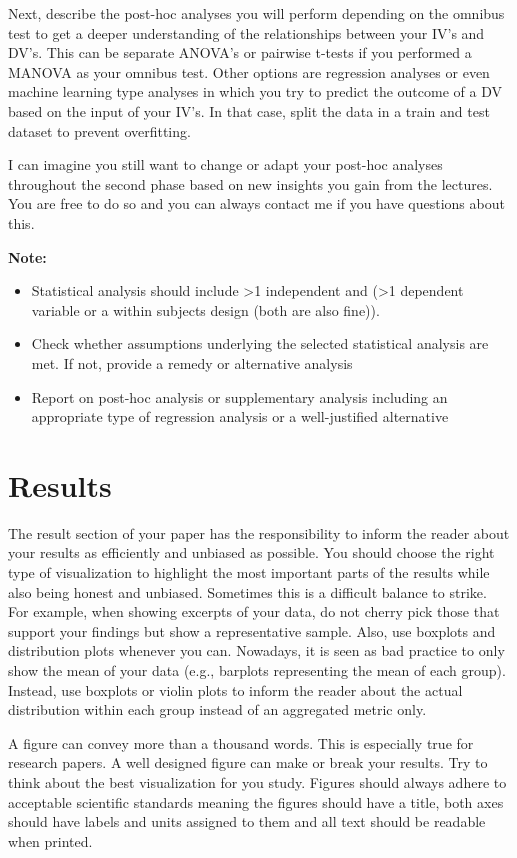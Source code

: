 \documentclass[10pt,a4paper]{article}
\begin{document}
Next, describe the post-hoc analyses you will perform depending on the omnibus test to get a deeper understanding of the relationships between your IV's and DV's. This can be separate ANOVA's or pairwise t-tests if you performed a MANOVA as your omnibus test. Other options are regression analyses or even machine learning type analyses in which you try to predict the outcome of a DV based on the input of your IV's. In that case, split the data in a train and test dataset to prevent overfitting. 

I can imagine you still want to change or adapt your post-hoc analyses throughout the second phase based on new insights you gain from the lectures. You are free to do so and you can always contact me if you have questions about this.

\textbf{Note:}
\begin{itemize}
    \item Statistical analysis should include >1 independent and (>1 dependent variable or a within subjects design (both are also fine)). 
    \item Check whether assumptions underlying the selected statistical analysis are met. If not, provide a remedy or alternative analysis
    \item Report on post-hoc analysis or supplementary analysis including an appropriate type of regression analysis or a well-justified alternative
\end{itemize}

\section{Results}
The result section of your paper has the responsibility to inform the reader about your results as efficiently and unbiased as possible. You should choose the right type of visualization to highlight the most important parts of the results while also being honest and unbiased. Sometimes this is a difficult balance to strike. For example, when showing excerpts of your data, do not cherry pick those that support your findings but show a representative sample. Also, use boxplots and distribution plots whenever you can. Nowadays, it is seen as bad practice to only show the mean of your data (e.g., barplots representing the mean of each group). Instead, use boxplots or violin plots to inform the reader about the actual distribution within each group instead of an aggregated metric only.  

A figure can convey more than a thousand words. This is especially true for research papers. A well designed figure can make or break your results. Try to think about the best visualization for you study. Figures should always adhere to acceptable scientific standards meaning the figures should have a title, both axes should have labels and units assigned to them and all text should be readable when printed. 
\end{document}
